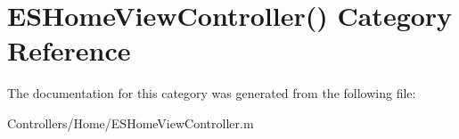 \hypertarget{category_e_s_home_view_controller_07_08}{}\section{E\+S\+Home\+View\+Controller() Category Reference}
\label{category_e_s_home_view_controller_07_08}


The documentation for this category was generated from the following file\+:\begin{DoxyCompactItemize}
\item 
Controllers/\+Home/E\+S\+Home\+View\+Controller.\+m\end{DoxyCompactItemize}
